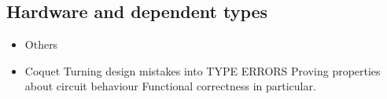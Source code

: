         \subsection{Hardware and dependent types}
        \label{sec:hardware-dtp}
            \begin{itemize}
                \item Others
                \item Coquet
                    \subitem Turning design mistakes into TYPE ERRORS
                    \subitem Proving properties about circuit behaviour
                    \subsubitem Functional correctness in particular.
            \end{itemize}
